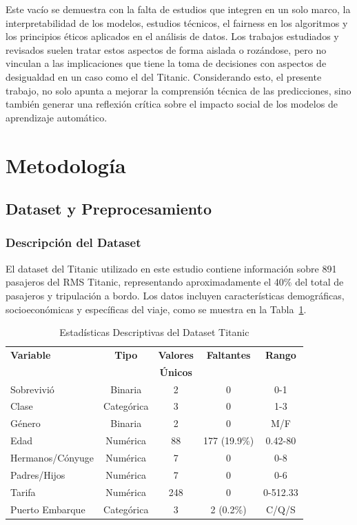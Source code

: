 \documentclass[conference]{IEEEtran}
\begin{document}
Este vacío se demuestra con la falta de estudios que integren en un solo marco, la interpretabilidad de los modelos, estudios técnicos, el fairness en los algoritmos y los principios éticos aplicados en el análisis de datos. Los trabajos estudiados y revisados suelen tratar estos aspectos de forma aislada o rozándose, pero no vinculan a las implicaciones que tiene la toma de decisiones con aspectos de desigualdad en un caso como el del Titanic. Considerando esto, el presente trabajo, no solo apunta a mejorar la comprensión técnica de las predicciones, sino también generar una reflexión crítica sobre el impacto social de los modelos de aprendizaje automático.




\section{Metodología}

\subsection{Dataset y Preprocesamiento}

\subsubsection{Descripción del Dataset}

El dataset del Titanic utilizado en este estudio contiene información sobre 891 pasajeros del RMS Titanic, representando aproximadamente el 40\% del total de pasajeros y tripulación a bordo. Los datos incluyen características demográficas, socioeconómicas y específicas del viaje, como se muestra en la Tabla~\ref{tab:dataset_stats}.

\begin{table}[htbp]
\caption{Estadísticas Descriptivas del Dataset Titanic}
\label{tab:dataset_stats}
\begin{center}
\begin{tabular}{|l|c|c|c|c|}
\hline
\textbf{Variable} & \textbf{Tipo} & \textbf{Valores} & \textbf{Faltantes} & \textbf{Rango} \\
 & & \textbf{Únicos} & & \\
\hline
Sobrevivió & Binaria & 2 & 0 & 0-1 \\
Clase & Categórica & 3 & 0 & 1-3 \\
Género & Binaria & 2 & 0 & M/F \\
Edad & Numérica & 88 & 177 (19.9\%) & 0.42-80 \\
Hermanos/Cónyuge & Numérica & 7 & 0 & 0-8 \\
Padres/Hijos & Numérica & 7 & 0 & 0-6 \\
Tarifa & Numérica & 248 & 0 & 0-512.33 \\
Puerto Embarque & Categórica & 3 & 2 (0.2\%) & C/Q/S \\
\hline
\end{tabular}
\end{center}
\end{table}
\end{document}

